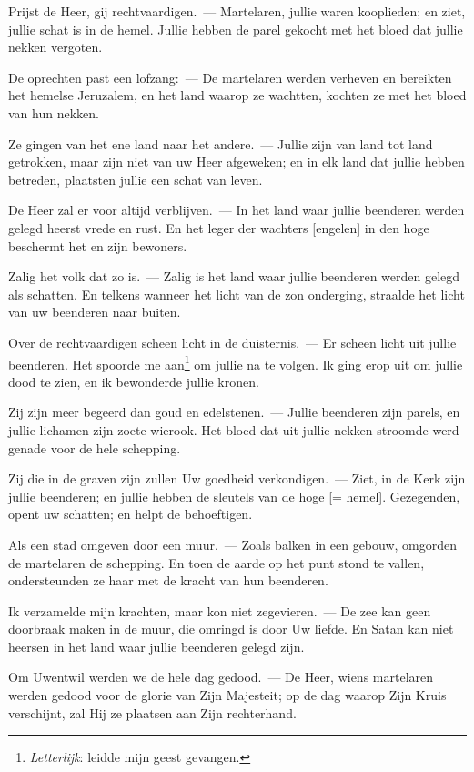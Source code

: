 \documentclass[12pt,twoside,a5paper]{article}
\begin{document}
\begin{halfparskip}
   Prijst de Heer, gij rechtvaardigen.~--- Martelaren, jullie waren kooplieden; en ziet, jullie schat is in de hemel. Jullie hebben de parel gekocht met het bloed dat jullie nekken vergoten.

  De oprechten past een lofzang:~--- De martelaren werden verheven en bereikten het hemelse Jeruzalem, en het land waarop ze wachtten, kochten ze met het bloed van hun nekken.

  Ze gingen van het ene land naar het andere.~--- Jullie zijn van land tot land getrokken, maar zijn niet van uw Heer afgeweken; en in elk land dat jullie hebben betreden, plaatsten jullie een schat van leven.

  De Heer zal er voor altijd verblijven.~--- In het land waar jullie beenderen werden gelegd heerst vrede en rust. En het leger der wachters [engelen] in den hoge beschermt het en zijn bewoners.

  Zalig het volk dat zo is.~--- Zalig is het land waar jullie beenderen werden gelegd als schatten. En telkens wanneer het licht van de zon onderging, straalde het licht van uw beenderen naar buiten.

  Over de rechtvaardigen scheen licht in de duisternis.~--- Er scheen licht uit jullie beenderen. Het spoorde me aan\footnote{\emph{Letterlijk}: leidde mijn geest gevangen.} om jullie na te volgen. Ik ging erop uit om jullie dood te zien, en ik bewonderde jullie kronen.

  Zij zijn meer begeerd dan goud en edelstenen.~--- Jullie beenderen zijn parels, en jullie lichamen zijn zoete wierook. Het bloed dat uit jullie nekken stroomde werd genade voor de hele schepping.

  Zij die in de graven zijn zullen Uw goedheid verkondigen.~--- Ziet, in de Kerk zijn jullie beenderen; en jullie hebben de sleutels van de hoge [= hemel]. Gezegenden, opent uw schatten; en helpt de behoeftigen.

  Als een stad omgeven door een muur.~--- Zoals balken in een gebouw, omgorden de martelaren de schepping. En toen de aarde op het punt stond te vallen, ondersteunden ze haar met de kracht van hun beenderen.

  Ik verzamelde mijn krachten, maar kon niet zegevieren.~--- De zee kan geen doorbraak maken in de muur, die omringd is door Uw liefde. En Satan kan niet heersen in het land waar jullie beenderen gelegd zijn.

  Om Uwentwil werden we de hele dag gedood.~--- De Heer, wiens martelaren werden gedood voor de glorie van Zijn Majesteit; op de dag waarop Zijn Kruis verschijnt, zal Hij ze plaatsen aan Zijn rechterhand.


\end{halfparskip}
\end{document}
